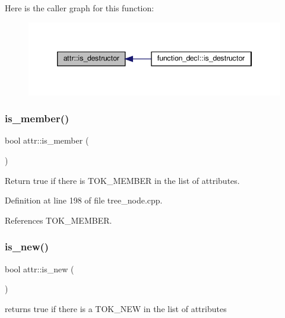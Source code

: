 Here is the caller graph for this function\+:
\nopagebreak
\begin{figure}[H]
\begin{center}
\leavevmode
\includegraphics[width=346pt]{dc/de4/structattr_a4dfbb6528d0735197b898f69a09ee6d2_icgraph}
\end{center}
\end{figure}
\mbox{\label{structattr_a5ef429dca662d82cbc5474e40f2d6ab5}} 
\subsubsection{\texorpdfstring{is\+\_\+member()}{is\_member()}}
{\footnotesize\ttfamily bool attr\+::is\+\_\+member (\begin{DoxyParamCaption}{ }\end{DoxyParamCaption})}



Return true if there is T\+O\+K\+\_\+\+M\+E\+M\+B\+ER in the list of attributes. 



Definition at line 198 of file tree\+\_\+node.\+cpp.



References T\+O\+K\+\_\+\+M\+E\+M\+B\+ER.

\mbox{\label{structattr_a7550e00bb1589c45f04f2c302db58e4f}} 
\subsubsection{\texorpdfstring{is\+\_\+new()}{is\_new()}}
{\footnotesize\ttfamily bool attr\+::is\+\_\+new (\begin{DoxyParamCaption}{ }\end{DoxyParamCaption})}



returns true if there is a T\+O\+K\+\_\+\+N\+EW in the list of attributes 



